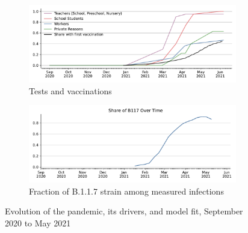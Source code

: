 \begin{figure}[!tp]
\begin{subfigure}[b]{0.475\textwidth}
        \includegraphics[width=\textwidth]{../figures/results/figures/data/testing/rapid_test_demand_shares}

        \caption{{\small Tests and vaccinations}}
        \label{fig:antigen_tests_vaccinations}
    \end{subfigure}
    \hfill
    \begin{subfigure}[b]{0.475\textwidth}
        \centering
        \includegraphics[width=\textwidth]{../figures/results/figures/data/share_of_b117_acc_to_rki}

        \caption{Fraction of B.1.1.7 strain among measured infections}
        \label{fig:share_b117}
    \end{subfigure}

    \caption{Evolution of the pandemic, its drivers, and model fit, September 2020 to May 2021}
    \label{fig:pandemic_drivers_model_fit}


\end{figure}

